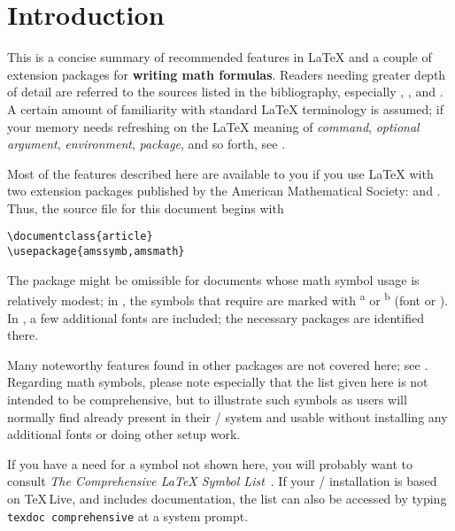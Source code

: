 \newpage


\section{Introduction}

This is a concise summary of recommended features in \LaTeX{} and a
couple of extension packages for \textbf{writing math formulas}. Readers
needing greater depth of detail are referred to the sources listed in
the bibliography, especially \cite{lamport}, \cite{amsldoc}, and
\cite{fntguide}. A certain amount of familiarity with standard \LaTeX{}
terminology is assumed; if your memory needs refreshing on the \LaTeX{}
meaning of \emph{command}, \emph{optional argument}, \emph{environment},
\emph{package}, and so forth, see \cite{lamport}.

Most of the features described here are available to you if you use
\LaTeX{} with two extension packages published by the American Mathematical
Society:  and . Thus, the source file for this
document begins with
\begin{verbatim}
\documentclass{article}
\usepackage{amssymb,amsmath}
\end{verbatim}
The  package might be omissible for documents whose math
symbol usage is relatively modest; in , the symbols
that require  are marked with \textsuperscript{a} or
\textsuperscript{b} (font  or ).  In ,
a few additional fonts are included; the necessary packages are identified
there.

Many noteworthy features found in other packages are not covered here;
see . Regarding math symbols, please note
especially that the list given here is not intended to be comprehensive,
but to illustrate such symbols as users will normally find already
present in their \lat/ system and usable without installing any
additional fonts or doing other setup work.

If you have a need for a symbol not shown here, you will probably want
to consult \emph{The Comprehensive \LaTeX{} Symbol List}~\cite{comprehensive}.
If your \lat/ installation is based on \TeX\,Live, and includes documentation,
the list can also be accessed by typing \texttt{texdoc comprehensive} at a
system prompt.

